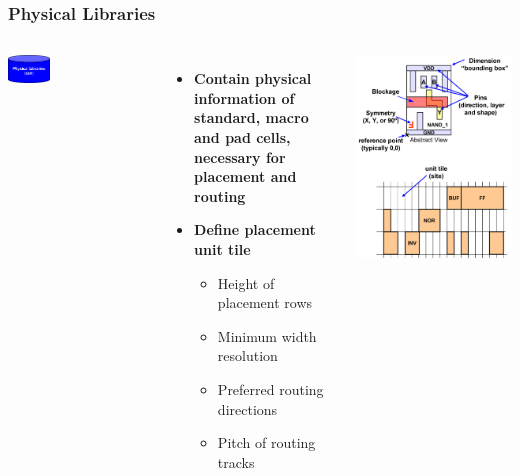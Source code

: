 \documentclass[compress]{beamer}
\begin{document}
\begin{frame}
	\frametitle{Physical Libraries}
	
		\begin{columns}	
		
				\begin{center}
				\includegraphics[width=0.3\textwidth]{LEF_1}
			\end{center}
			\begin{itemize}
				\item \textbf{Contain physical information
				of standard, macro and pad
				cells, necessary for placement
				and routing}
				\item \textbf{Define placement unit tile}
				\begin{itemize}
					\item Height of placement rows
					\item Minimum width resolution
					\item Preferred routing directions
					\item Pitch of routing tracks
				\end{itemize}
				
			\end{itemize}
			\begin{center}
				\includegraphics[width=0.8 \textwidth]{LEF}
			\end{center}
		\end{columns}
\end{frame}
\end{document}

